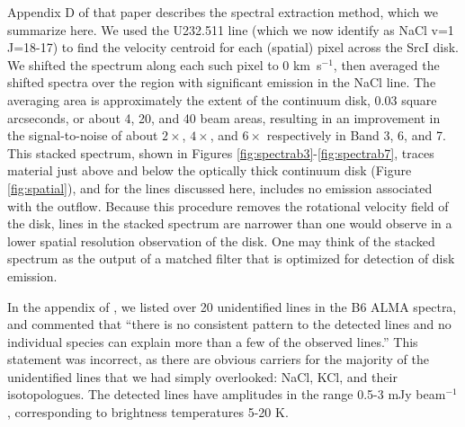\documentclass[12pt]{article}
\newcommand{\sourcei}{SrcI\xspace}
\newcommand{\kms}{\textrm{km~s}\ensuremath{^{-1}}\xspace}	%
\begin{document}
Appendix D of that paper describes the spectral extraction method,
which we summarize here.  We used the U232.511 line (which we now identify as
NaCl v=1 J=18-17) to find the velocity centroid for each (spatial) pixel
across the \sourcei disk.  We shifted the spectrum along
each such pixel to 0 \kms, then averaged the shifted spectra over the region with
significant emission in the NaCl line.  
The
averaging area is approximately the extent of the continuum disk, 0.03 square
arcseconds, or about 4, 20, and 40  beam areas, resulting
in an improvement in the signal-to-noise of about $2\times$, $4\times$, and $6\times$
respectively in Band 3, 6, and 7.
This stacked spectrum, shown in Figures \ref{fig:spectrab3}-\ref{fig:spectrab7},
traces material just above and below the optically thick continuum disk
(Figure \ref{fig:spatial}), and for the lines discussed here, includes no
emission associated with the outflow.  
Because this procedure removes the rotational velocity field of the disk,
lines in the stacked spectrum are narrower than one would observe in
a lower spatial resolution observation of the disk.  One may think of the
stacked spectrum as the output of a matched filter that is optimized for
detection of disk emission.



In the appendix of \cite{Ginsburg2018b}, we listed over 20 unidentified 
lines in the B6 ALMA spectra, and commented that ``there is no
consistent pattern to the detected lines and no individual species can explain
more than a few of the observed lines.''  This statement was incorrect, as
there are obvious carriers for the majority of the unidentified lines that we
had simply overlooked: NaCl, KCl, and their isotopologues.  The
detected lines have amplitudes in the range 0.5-3 mJy beam$^{-1}$, corresponding
to brightness temperatures 5-20 K.  
\end{document}
